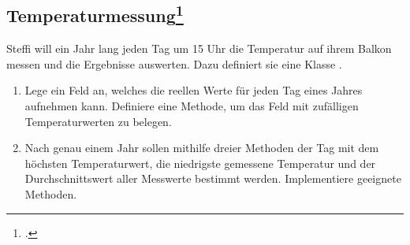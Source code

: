 \documentclass{lehramt-informatik-haupt}
\begin{document}
\begin{itemize}
%

\section{Temperaturmessung\footcite[Seite 61, Klett, Informatik 3, S. 68]{oomup:fs:3}}

Steffi will ein Jahr lang jeden Tag um 15 Uhr die Temperatur auf ihrem
Balkon messen und die Ergebnisse auswerten. Dazu definiert sie eine
Klasse .

\begin{enumerate}


\item Lege ein Feld  an, welches die reellen Werte für
jeden Tag eines Jahres aufnehmen kann. Definiere eine Methode, um das
Feld mit zufälligen Temperaturwerten zu belegen.


\item Nach genau einem Jahr sollen mithilfe dreier Methoden der Tag mit
dem höchsten Temperaturwert, die niedrigste gemessene Temperatur und der
Durchschnittswert aller Messwerte bestimmt werden. Implementiere
geeignete Methoden.

\begin{antwort}
\end{antwort}

\end{enumerate}

\end{itemize}

\literatur
\end{document}
